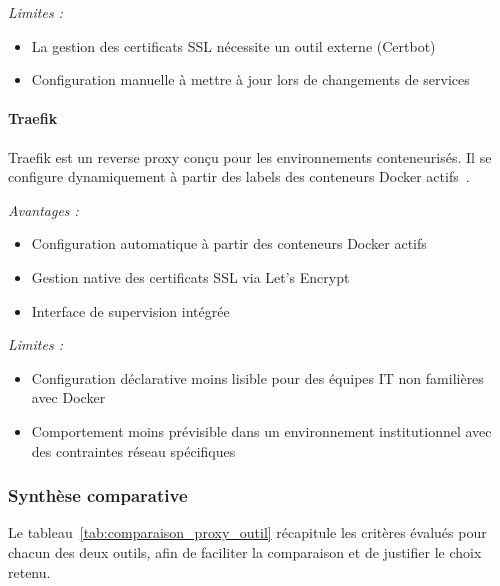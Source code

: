 \textit{Limites :}
\begin{itemize}
  \item La gestion des certificats SSL nécessite un outil externe
        (Certbot)
  \item Configuration manuelle à mettre à jour lors de changements
        de services
\end{itemize}

\paragraph{Traefik}

Traefik est un reverse proxy conçu pour les environnements
conteneurisés. Il se configure dynamiquement à partir des labels
des conteneurs Docker actifs~\cite{traefik_dev}.

\textit{Avantages :}
\begin{itemize}
  \item Configuration automatique à partir des conteneurs Docker actifs
  \item Gestion native des certificats SSL via Let's Encrypt
  \item Interface de supervision intégrée
\end{itemize}

\textit{Limites :}
\begin{itemize}
  \item Configuration déclarative moins lisible pour des équipes IT
        non familières avec Docker
  \item Comportement moins prévisible dans un environnement
        institutionnel avec des contraintes réseau spécifiques
\end{itemize}

\subsubsection{Synthèse comparative}

Le tableau~\ref{tab:comparaison_proxy_outil} récapitule les critères évalués pour chacun des
deux outils, afin de faciliter la comparaison et de justifier le
choix retenu.

